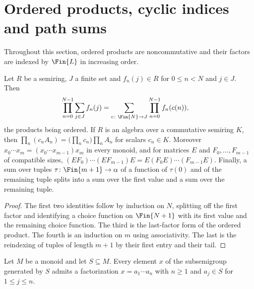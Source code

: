 \section{Ordered products, cyclic indices and path sums}

Throughout this section, ordered products are noncommutative and their
factors are indexed by $\Fin{L}$ in increasing order.

\begin{lemma}
    \label{lem:elementary_ordered_product_sum}
    \leanok
    Let $R$ be a semiring, $J$ a finite set and $f_n(j)\in R$ for
    $0\le n<N$ and $j\in J$. Then
    \begin{align}
        \prod_{n=0}^{N-1}\sum_{j\in J}f_n(j)
         & =\sum_{c\colon\Fin{N}\to J}\prod_{n=0}^{N-1}f_n(c(n)),
        \notag
    \end{align}
    the products being ordered. If $R$ is an algebra over a commutative
    semiring $K$, then
    $\prod_n(c_nA_n)=\bigl(\prod_nc_n\bigr)\prod_nA_n$ for scalars
    $c_n\in K$. Moreover $x_0\cdots x_m=(x_0\cdots x_{m-1})x_m$ in every
    monoid, and for matrices $E$ and $F_0,\ldots,F_{m-1}$ of compatible sizes,
    $(EF_0)\cdots(EF_{m-1})E=E(F_0E)\cdots(F_{m-1}E)$. Finally, a sum over
    tuples $\tau\colon\Fin{m+1}\to\alpha$ of a function of $\tau(0)$ and of the
    remaining tuple splits into a sum over the first value and a sum over the
    remaining tuple.
\end{lemma}

\begin{proof}
    \leanok
    The first two identities follow by induction on $N$, splitting off the
    first factor and identifying a choice function on $\Fin{N+1}$ with its
    first value and the remaining choice function. The third is the last-factor
    form of the ordered product. The fourth is an induction on $m$ using
    associativity. The last is the reindexing of tuples of length $m+1$ by
    their first entry and their tail.
\end{proof}

\begin{lemma}
    \label{lem:subsemigroup_closure_nonempty_product}
    \leanok
    Let $M$ be a monoid and let $S\subseteq M$. Every element $x$ of the
    subsemigroup generated by $S$ admits a factorization $x=a_1\cdots a_n$
    with $n\geq1$ and $a_j\in S$ for $1\leq j\leq n$.
\end{lemma}

